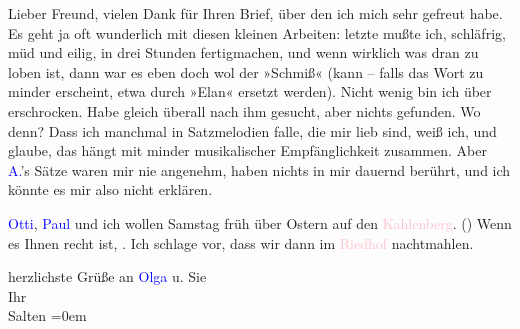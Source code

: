 \pstart
           Lieber Freund, vielen Dank für Ihren Brief, über den ich mich sehr
               gefreut habe. Es geht ja oft wunderlich mit diesen kleinen Arbeiten: \label{K_L03394-1v}\label{K_L03394-1h} letzte mußte ich, schläfrig, müd und eilig,
               in drei Stunden fertigmachen, und wenn wirklich was dran zu loben ist, dann war es
               eben doch wol der »Schmiß« (kann – falls das Wort zu minder erscheint, etwa durch
               »Elan« ersetzt werden). Nicht wenig bin ich über \label{K_L03394-2v}\label{K_L03394-2h} erschrocken. Habe gleich überall nach ihm gesucht, aber nichts gefunden. Wo
               denn? Dass ich manchmal in Satzmelodien falle, die mir lieb sind, weiß ich, und
               glaube, das hängt mit minder musikalischer Empfänglichkeit zusammen. Aber \textcolor{blue}{A.}{}\ledrightnote{\textcolor{blue}{Peter Altenberg}}’s Sätze waren mir nie angenehm, haben nichts
               in mir dauernd berührt, und ich könnte es mir also nicht erklären.\pend
           
\pstart
           \textcolor{blue}{Otti}{}\ledrightnote{\textcolor{blue}{Ottilie Salten}}, \textcolor{blue}{Paul}{}\ledrightnote{\textcolor{blue}{Paul Salten}} und ich wollen Samstag früh über Ostern
               auf den \textcolor{pink}{Kahlenberg}{}\ledrightnote{\textcolor{pink}{Kahlenberg}}. (\label{K_L03394-3v}\label{K_L03394-3h}) Wenn es Ihnen recht ist, \label{K_L03394-4v}\label{K_L03394-4h}. Ich schlage vor, dass wir dann im \textcolor{pink}{Riedhof}{}\ledrightnote{\textcolor{pink}{Riedhof}}
               nachtmahlen.\pend
           
\pstart
           herzlichste Grüße an \textcolor{blue}{Olga}{}\ledrightnote{\textcolor{blue}{Olga Schnitzler}} u. Sie {\\[\baselineskip]}Ihr {\\[\baselineskip]}\spacefill\mbox{Salten}\pend
           \leftskip=0em{}\endnumbering{}  
      